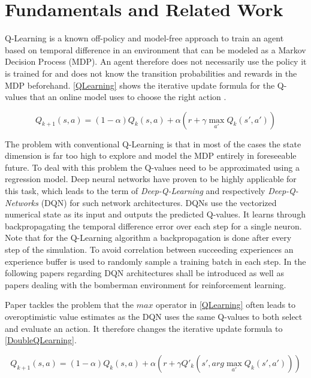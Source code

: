 \section{Fundamentals and Related Work} \label{fundamentals_related_work}

Q-Learning is a known off-policy and model-free approach to train an agent based on temporal difference in an environment that can be modeled as a Markov Decision Process (MDP). An agent therefore does not necessarily use the policy it is trained for and does not know the transition probabilities and rewards in the MDP beforehand. \autoref{QLearning} shows the iterative update formula for the Q-values that an online model uses to choose the right action \cite{Geron2018}.

\begin{equation} \label{QLearning}
	Q_{k+1}(s,a) = (1-\alpha) Q_k(s,a) + \alpha(r + \gamma \max_{a'} Q_k(s',a')) 
\end{equation}

The problem with conventional Q-Learning is that in most of the cases the state dimension is far too high to explore and model the MDP entirely in foreseeable future. To deal with this problem the Q-values need to be approximated using a regression model. Deep neural networks have proven to be highly applicable for this task, which leads to the term of \textit{Deep-Q-Learning} and respectively \textit{Deep-Q-Networks} (DQN) for such network architectures. DQNs use the vectorized numerical state as its input and outputs the predicted Q-values. It learns through backpropagating the temporal difference error over each step for a single neuron. Note that for the Q-Learning algorithm a backpropagation is done after every step of the simulation. To avoid correlation between succeeding experiences an experience buffer is used to randomly sample a training batch in each step. In the following papers regarding DQN architectures shall be introduced as well as papers dealing with the bomberman environment for reinforcement learning. 

Paper \cite{vanHasselt2015} tackles the problem that the $max$ operator in \ref{QLearning} often leads to overoptimistic value estimates as the DQN uses the same Q-values to both select and evaluate an action. It therefore changes the iterative update formula to \ref{DoubleQLearning}.

\begin{equation} \label{DoubleQLearning}
	Q_{k+1}(s,a) = (1-\alpha) Q_k(s,a) + \alpha(r + \gamma Q'_k(s', arg\max_{a'} Q_k(s',a'))) 
\end{equation}

